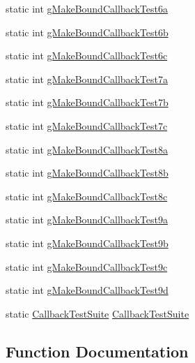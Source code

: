 \begin{DoxyCompactItemize}
\item 
static int \hyperlink{callback-test-suite_8cc_a80c930d6600e3ec5df67a4f96c82bc08}{g\+Make\+Bound\+Callback\+Test6a}
\item 
static int \hyperlink{callback-test-suite_8cc_a28424166f0abaca2b5859849a24ff160}{g\+Make\+Bound\+Callback\+Test6b}
\item 
static int \hyperlink{callback-test-suite_8cc_a4f5ef2a5a13748e5c4235f991d134a64}{g\+Make\+Bound\+Callback\+Test6c}
\item 
static int \hyperlink{callback-test-suite_8cc_a5e1517ba472cb373d210f6c4bf650774}{g\+Make\+Bound\+Callback\+Test7a}
\item 
static int \hyperlink{callback-test-suite_8cc_a2fb964f8eaa6d045940c6b483930d1ed}{g\+Make\+Bound\+Callback\+Test7b}
\item 
static int \hyperlink{callback-test-suite_8cc_a18bc2f4e64af63bb92d7ea129cee841f}{g\+Make\+Bound\+Callback\+Test7c}
\item 
static int \hyperlink{callback-test-suite_8cc_afa2dde26eb4eaba1ab619cca192e69b0}{g\+Make\+Bound\+Callback\+Test8a}
\item 
static int \hyperlink{callback-test-suite_8cc_aa7b516443d299bb17a157ccff02e4f1e}{g\+Make\+Bound\+Callback\+Test8b}
\item 
static int \hyperlink{callback-test-suite_8cc_ae36d0de967cac6dfce6c7cb5d82a0f34}{g\+Make\+Bound\+Callback\+Test8c}
\item 
static int \hyperlink{callback-test-suite_8cc_a364c841620e810ce54feed3c02bfc44d}{g\+Make\+Bound\+Callback\+Test9a}
\item 
static int \hyperlink{callback-test-suite_8cc_a5343074ba158ded308eb54ae42f5f9b1}{g\+Make\+Bound\+Callback\+Test9b}
\item 
static int \hyperlink{callback-test-suite_8cc_af40ff68587a2a87943fdedad6c0cb130}{g\+Make\+Bound\+Callback\+Test9c}
\item 
static int \hyperlink{callback-test-suite_8cc_accb9e8c0a669d5e464627b352f740474}{g\+Make\+Bound\+Callback\+Test9d}
\item 
static \hyperlink{classCallbackTestSuite}{Callback\+Test\+Suite} \hyperlink{callback-test-suite_8cc_a75e67efc74c14dfa3a8a029de6d99951}{Callback\+Test\+Suite}
\end{DoxyCompactItemize}


\subsection{Function Documentation}
